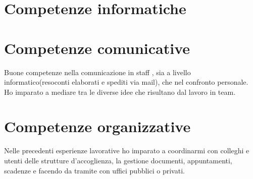 \documentclass[12pt,a4paper,sans]{moderncv} %
\begin{document}
\section{Competenze informatiche}
\section{Competenze comunicative}
Buone competenze nella comunicazione in staff , sia a livello informatico(resoconti elaborati e spediti via mail), che nel confronto personale. Ho imparato a mediare tra le diverse idee che risultano dal lavoro in team.
\section{Competenze organizzative}
Nelle precedenti esperienze lavorative ho imparato a coordinarmi con colleghi e utenti delle strutture d'accoglienza, la gestione  documenti, appuntamenti, scadenze e facendo da tramite con uffici pubblici o privati.






%

\end{document}

